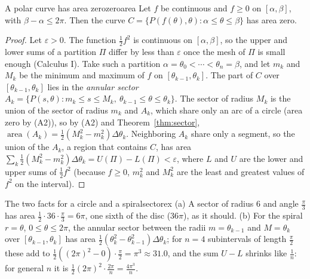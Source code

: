 \documentclass[11pt]{article}
\begin{document}
\begin{thm}{A polar curve has area zero}{zeroarea}
Let $f$ be continuous and $f\ge0$ on $[\alpha,\beta]$, with $\beta-\alpha\le2\pi$. Then the curve $C=\{P(f(\theta),\theta):\alpha\le\theta\le\beta\}$ has area zero.
\end{thm}
\begin{proof}
Let $\varepsilon>0$. The function $\frac12f^2$ is continuous on $[\alpha,\beta]$, so the upper and lower sums of a partition $\Pi$ differ by less than $\varepsilon$ once the mesh of $\Pi$ is small enough (Calculus I). Take such a partition $\alpha=\theta_0<\cdots<\theta_n=\beta$, and let $m_k$ and $M_k$ be the minimum and maximum of $f$ on $[\theta_{k-1},\theta_k]$. The part of $C$ over $[\theta_{k-1},\theta_k]$ lies in the \emph{annular sector} $A_k=\{P(s,\theta):m_k\le s\le M_k,\ \theta_{k-1}\le\theta\le\theta_k\}$. The sector of radius $M_k$ is the union of the sector of radius $m_k$ and $A_k$, which share only an arc of a circle (area zero by (A2)), so by (A2) and Theorem~\ref{thm:sector}, $\operatorname{area}(A_k)=\frac12\left(M_k^2-m_k^2\right)\Delta\theta_k$. Neighboring $A_k$ share only a segment, so the union of the $A_k$, a region that contains $C$, has area $\sum_k\frac12\left(M_k^2-m_k^2\right)\Delta\theta_k=U(\Pi)-L(\Pi)<\varepsilon$, where $L$ and $U$ are the lower and upper sums of $\frac12f^2$ (because $f\ge0$, $m_k^2$ and $M_k^2$ are the least and greatest values of $f^2$ on the interval).
\end{proof}

\begin{exmp}{The two facts for a circle and a spiral}{sectorex}
(a) A sector of radius $6$ and angle $\frac\pi3$ has area $\frac12\cdot36\cdot\frac\pi3=6\pi$, one sixth of the disc ($36\pi$), as it should. (b) For the spiral $r=\theta$, $0\le\theta\le2\pi$, the annular sector between the radii $m=\theta_{k-1}$ and $M=\theta_k$ over $[\theta_{k-1},\theta_k]$ has area $\frac12\left(\theta_k^2-\theta_{k-1}^2\right)\Delta\theta_k$; for $n=4$ subintervals of length $\frac\pi2$ these add to $\frac12\left((2\pi)^2-0\right)\cdot\frac\pi2=\pi^3\approx31.0$, and the sum $U-L$ shrinks like $\frac1n$: for general $n$ it is $\frac12(2\pi)^2\cdot\frac{2\pi}n=\frac{4\pi^3}n$.
\end{exmp}
\end{document}

